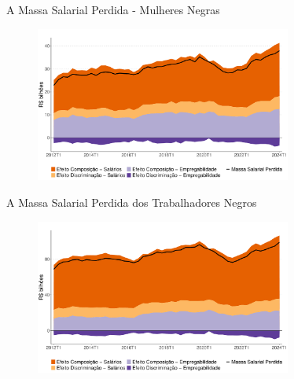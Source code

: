 \documentclass[10pt, xcolor=x11names,compress]{beamer}
\begin{document}
	\begin{frame}{A Massa Salarial Perdida - Mulheres Negras}
	\begin{figure}
		\centering
		\includegraphics[width = 0.75\textwidth]{figures_output/mulher_negra_massa_perdida_gph.pdf}
	\end{figure}
	\end{frame}		
	
	\begin{frame}{A Massa Salarial Perdida dos Trabalhadores Negros}
	\begin{figure}
		\centering
		\includegraphics[width = 0.75\textwidth]{figures_output/massa_perdida_gph.pdf}
	\end{figure}
	\end{frame}		
		
\end{document}
